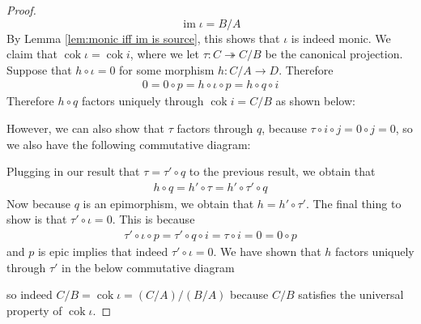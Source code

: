 \documentclass{article}
\DeclareMathOperator{\im}{im}
\DeclareMathOperator{\cok}{cok}
\begin{document}
\begin{proof}
    \[
    \im \iota=B/A
    \]
    By Lemma \ref{lem:monic iff im is source}, this shows that $\iota$ is indeed monic.
    We claim that $\cok \iota =\cok i$, where we let $\tau:C\twoheadrightarrow C/B$ be the canonical projection. Suppose that $h\circ \iota=0$ for some morphism $h:C/A\to D$. Therefore
    \begin{align*}
        0=0\circ p=h\circ \iota \circ p=h\circ q \circ i
    \end{align*}
Therefore $h\circ q$ factors uniquely through $\cok i=C/B$ as shown below:
\begin{center}
\end{center}
However, we can also show that $\tau$ factors through $q$, because $\tau \circ i \circ j=0\circ j=0$, so we also have the following commutative diagram:
\begin{center}
\end{center}
    Plugging in our result that $\tau=\tau'\circ q$ to the previous result, we obtain that
    \begin{align*}
        h\circ q=h'\circ \tau=h'\circ \tau' \circ q
    \end{align*}
    Now because $q$ is an epimorphism, we obtain that $h=h'\circ \tau'$. The final thing to show is that $\tau'\circ \iota=0$. This is because
    \begin{align*}
        \tau'\circ \iota\circ p=\tau'\circ q \circ i=\tau \circ i=0=0\circ p
    \end{align*}
    and $p$ is epic implies that indeed $\tau'\circ \iota=0$. We have shown that $h$ factors uniquely through $\tau'$ in the below commutative diagram
    \begin{center}
    \end{center}
    so indeed $C/B=\cok \iota=(C/A)/(B/A)$ because $C/B$ satisfies the universal property of $\cok \iota$.
\end{proof}
\end{document}
